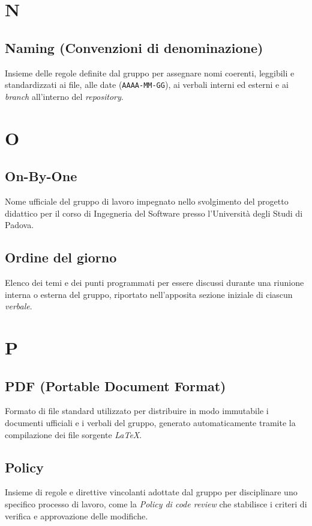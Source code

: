 \documentclass[11pt, a4paper]{article}
\begin{document}
\newpage

\section*{N}

\subsection*{Naming (Convenzioni di denominazione)}
Insieme delle regole definite dal gruppo per assegnare nomi coerenti, leggibili e standardizzati ai file, alle date (\texttt{AAAA-MM-GG}), ai verbali interni ed esterni e ai \textit{branch} all'interno del \textit{repository}.

\section*{O}

\subsection*{On-By-One}
Nome ufficiale del gruppo di lavoro impegnato nello svolgimento del progetto didattico per il corso di Ingegneria del Software presso l'Università degli Studi di Padova.

\subsection*{Ordine del giorno}
Elenco dei temi e dei punti programmati per essere discussi durante una riunione interna o esterna del gruppo, riportato nell'apposita sezione iniziale di ciascun \textit{verbale}.

\section*{P}

\subsection*{PDF (Portable Document Format)}
Formato di file standard utilizzato per distribuire in modo immutabile i documenti ufficiali e i verbali del gruppo, generato automaticamente tramite la compilazione dei file sorgente \textit{LaTeX}.

\subsection*{Policy}
Insieme di regole e direttive vincolanti adottate dal gruppo per disciplinare uno specifico processo di lavoro, come la \textit{Policy di code review} che stabilisce i criteri di verifica e approvazione delle modifiche.
\end{document}

